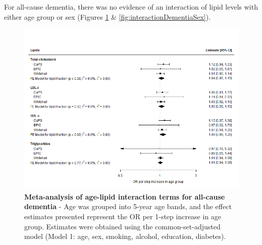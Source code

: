 \documentclass[a4paper, twoside]{templates/ociamthesis}
\begin{document}
For all-cause dementia, there was no evidence of an interaction of lipid levels with either age group or sex (Figures \ref{fig:interactionDementiaAge} \& \ref{fig:interactionDementiaSex}).





\begin{figure}[H]
\includegraphics[width=1\linewidth]{figures/ipd/interaction_age_dementia} \caption[Meta-analysis of age-lipid interaction terms for all-cause dementia]{\textbf{Meta-analysis of age-lipid interaction terms for all-cause dementia} - Age was grouped into 5-year age bands, and the effect estimates presented represent the OR per 1-step increase in age group. Estimates were obtained using the common-set-adjusted model (Model 1: age, sex, smoking, alcohol, education, diabetes).}\label{fig:interactionDementiaAge}
\end{figure}
\end{document}
